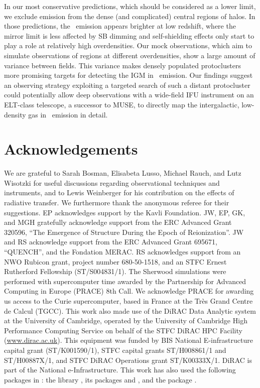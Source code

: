 In our most conservative predictions, which should be considered as a lower limit, we exclude emission from the dense (and complicated) central regions of halos. In those predictions, the \lya\ emission appears brighter at low redshift, where the mirror limit is less affected by SB dimming and self-shielding effects only start to play a role at relatively high overdensities. Our mock observations, which aim to simulate observations of regions at different overdensities, show a large amount of variance between fields. This variance makes densely populated protoclusters more promising targets for detecting the IGM in \lya\ emission. Our findings suggest an observing strategy exploiting a targeted search of such a distant protocluster could potentially allow deep observations with a wide-field IFU instrument on an ELT-class telescope, a successor to MUSE, to directly map the intergalactic, low-density gas in \lya\ emission in detail.

\section*{Acknowledgements}
\label{sec:Acknowledgements}

We are grateful to Sarah Bosman, Elisabeta Lusso, Michael Rauch, and Lutz Wisotzki for useful discussions regarding observational techniques and instruments, and to Lewis Weinberger for his contribution on the effects of radiative transfer. We furthermore thank the anonymous referee for their suggestions. EP acknowledges support by the Kavli Foundation. JW, EP, GK, and MGH gratefully acknowledge support from the ERC Advanced Grant 320596, ``The Emergence of Structure During the Epoch of Reionization''. JW and RS acknowledge support from the ERC Advanced Grant 695671, ``QUENCH'', and the Fondation MERAC. RS acknowledges support from an NWO Rubicon grant, project number 680-50-1518, and an STFC Ernest Rutherford Fellowship (ST/S004831/1). The Sherwood simulations were performed with supercomputer time awarded by the Partnership for Advanced Computing in Europe (PRACE) 8th Call. We acknowledge PRACE for awarding us access to the Curie supercomputer, based in France at the Tr\`es Grand Centre de Calcul (TGCC). This work also made use of the DiRAC Data Analytic system at the University of Cambridge, operated by the University of Cambridge High Performance Computing Service on behalf of the STFC DiRAC HPC Facility (\url{www.dirac.ac.uk}). This equipment was funded by BIS National E-infrastructure capital grant (ST/K001590/1), STFC capital grants ST/H008861/1 and ST/H00887X/1, and STFC DiRAC Operations grant ST/K00333X/1. DiRAC is part of the National e-Infrastructure. This work has also used the following packages in : the  library \citep{Jones2001}, its packages  \citep{2011CSE....13b..22V} and  \citep{Hunter2007}, and the  package \citep{2013A&A...558A..33A, 2018AJ....156..123A}.